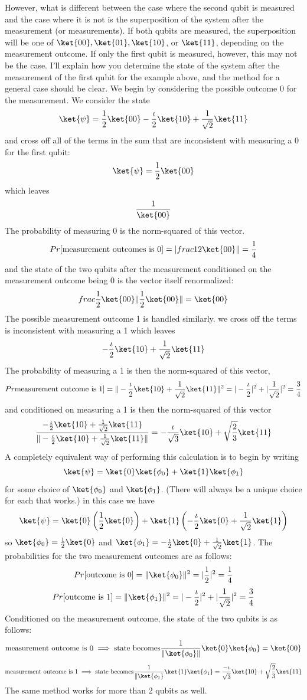 \documentclass[12pt, oneside]{book}
\theoremstyle{definition}
\theoremstyle{definition}
\theoremstyle{remark}
\begin{document}
However, what is different between the case where the second qubit is measured and the case
where it is not is the superposition of the system after the measurement (or measurements). If both
qubits are measured, the superposition will be one of $\ket{00},\ket{01},\ket{10}$, or $\ket{11}$, depending on the
measurement outcome. If only the first qubit is measured, however, this may not be the case.
I’ll explain how you determine the state of the system after the measurement of the first qubit
for the example above, and the method for a general case should be clear. We begin by considering
the possible outcome 0 for the measurement. We consider the state
\[
\ket{\psi}=\frac{1}{2}\ket{00}-\frac{\iota}{2}\ket{10}+\frac{1}{\sqrt{2}}\ket{11}
\]
and cross off all of the terms in the sum that are inconsistent with measuring a $0$ for the first qubit:
\[
\ket{\psi}=\frac{1}{2}\ket{00}
\]
which leaves
\[
\frac{1}{\ket{00}}
\]
The probability of measuring 0 is the norm-squared of this vector.
\[
Pr\text{[measurement outcomes is 0]}=|\\frac{1}{2}\ket{00}\|=\frac{1}{4}
\]
and the state of the two qubits after the measurement conditioned on the measurement outcome being 0 is the vector itself renormalized:
\[
frac{\frac{1}{2}\ket{00}}{\|\frac{1}{2}\ket{00}\|}=\ket{00}
\]
The possible measurement outcome 1 is handled similarly. we cross off the terms is inconsistent with measuring a 1 which leaves
\[
-\frac{\iota}{2}\ket{10}+\frac{1}{\sqrt{2}}\ket{11}
\]
The probability of measuring a 1 is then the norm-squared of this vector,
\[
Pr\text{measurement outcome is 1]}=\|-\frac{\iota}{2}\ket{10}+\frac{1}{\sqrt{2}}\ket{11}\|^2=|-\frac{\iota}{2}|^2+|\frac{1}{\sqrt{2}}|^2=\frac{3}{4}
\]
and conditioned on measuring a 1 is then the norm-squared of this vector
\[
\frac{-\frac{\iota}{2}\ket{10}+\frac{1}{\sqrt{2}}\ket{11}}{\|-\frac{\iota}{2}\ket{10}+\frac{1}{\sqrt{2}}\ket{11}\|}=-\frac{\iota}{\sqrt{3}}\ket{10}+\sqrt{\frac{2}{3}}\ket{11}
\]
A completely equivalent way of performing this calculation is to begin by writing
\[
\ket{\psi}=\ket{0}\ket{\phi_0}+\ket{1}\ket{\phi_1}
\]
for some choice of $\ket{\phi_0}$ and $\ket{\phi_1}$. (There will always be a unique choice for each that works.) in this case we have
\[
\ket{\psi}=\ket{0}\left(\frac{1}{2}\ket{0}\right)+\ket{1}\left(-\frac{\iota}{2}\ket{0}+\frac{1}{\sqrt{2}}\ket{1}\right)
\]
so $\ket{\phi_0}=\frac{1}{2}\ket{0}$ and $\ket{\phi_1}=-\frac{\iota}{2}\ket{0}+\frac{1}{\sqrt{2}}\ket{1}$. The probabilities for the two measurement outcomes are as follows:
\[
Pr\text{[outcome is 0]}=\|\ket{\phi_0}\|^2=|\frac{1}{2}|^2=\frac{1}{4}
\]
\[
Pr\text{[outcome is 1]}=\|\ket{\phi_1}\|^2=|-\frac{\iota}{2}|^2+|\frac{1}{\sqrt{2}}|^2=\frac{3}{4}
\]
Conditioned on the measurement outcome, the state of the two qubits is as follows:
\[
\text{measurement outcome is 0}\implies \text{state becomes} \frac{1}{\|\ket{\phi_0}\|}\ket{0}\ket{\phi_0}=\ket{00}
\]
\[
\text{measurement outcome is 1} \implies \text{state becomes}\frac{1}{\|\ket{\phi_1}}\ket{1}\ket{\phi_1}=\frac{-\iota}{\sqrt{3}}\ket{10}+\sqrt{\frac{2}{3}}\ket{11}
\]
The same method works for more than 2 qubits as well.
\end{document}
